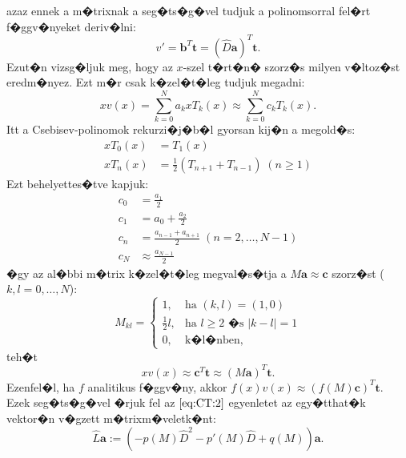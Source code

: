 azaz ennek a m�trixnak a seg�ts�g�vel tudjuk a polinomsorral fel�rt f�ggv�nyeket deriv�lni:
\begin{equation*}
v' = \mathbf{b}^T \mathbf{t} = (\hat{D}\mathbf{a})^T \mathbf{t}.
\end{equation*}
Ezut�n vizsg�ljuk meg, hogy az $x$-szel t�rt�n� szorz�s milyen v�ltoz�st eredm�nyez. Ezt m�r csak k�zel�t�leg tudjuk megadni:
\begin{equation*}
x v(x) = \sum_{k = 0}^N a_k x T_k(x) \approx \sum_{k = 0}^N c_k T_k(x).
\end{equation*}
Itt a Csebisev-polinomok rekurzi�j�b�l gyorsan kij�n a megold�s:
\begin{align*}
x T_0(x) &= T_1(x) \\
x T_n(x) &= \frac{1}{2} \left( T_{n+1} + T_{n-1} \right) \; (n \geq 1)
\end{align*}
Ezt behelyettes�tve kapjuk:
\begin{align*}
c_0 &= \frac{a_1}{2} \\
c_1 &= a_0 + \frac{a_2}{2} \\
c_n &= \frac{a_{n-1} + a_{n+1}}{2} \; (n = 2, \dots, N-1) \\
c_N &\approx \frac{a_{N-1}}{2}
\end{align*}
�gy az al�bbi m�trix k�zel�t�leg megval�s�tja a $M \mathbf{a} \approx \mathbf{c}$ szorz�st ($k, l = 0, \dots, N$):
\begin{equation*}
M_{kl} =
	\begin{cases}
	1, &\text{ha }(k, l) = (1, 0) \\
	\frac{1}{2}l, &\text{ha } l \geq 2 \text{ �s } |k - l| = 1 \\
	0, &\text{k�l�nben},
	\end{cases}
\end{equation*}
teh�t
\begin{equation*}
x v(x) \approx \mathbf{c}^T \mathbf{t} \approx (M \mathbf{a})^T \mathbf{t}.
\end{equation*}
Ezenfel�l, ha $f$ analitikus f�ggv�ny, akkor $f(x) v(x) \approx (f(M)\mathbf{c})^T \mathbf{t}$. \\ %
Ezek seg�ts�g�vel �rjuk fel az $\eqref{eq:CT:2}$ egyenletet az egy�tthat�k vektor�n v�gzett m�trixm�veletk�nt:
\begin{equation*}
\hat{L} \mathbf{a} := \left( -p(M) \hat{D}^2 - p'(M) \hat{D} + q(M) \right) \mathbf{a}.
\end{equation*}
